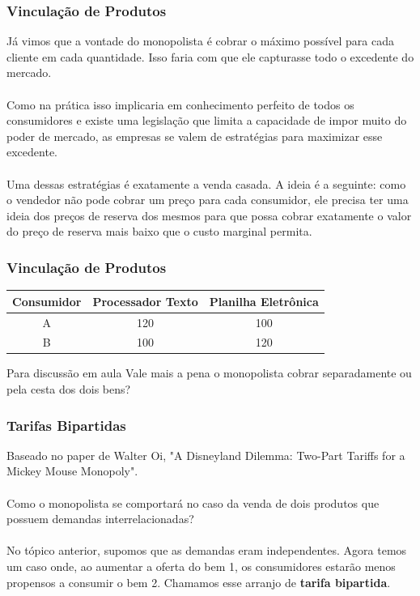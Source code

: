 \documentclass{beamer}[10]
\begin{document}

\begin{frame}
	\frametitle{Vinculação de Produtos}

	Já vimos que a vontade do monopolista é cobrar o máximo possível para cada cliente em cada quantidade. Isso faria com que ele capturasse todo o excedente do mercado. 
	\\~\\
	Como na prática isso implicaria em conhecimento perfeito de todos os consumidores e existe uma legislação que limita a capacidade de impor muito do poder de mercado, as empresas se valem de estratégias para maximizar esse excedente.
	\\~\\
	Uma dessas estratégias é exatamente a venda casada. A ideia é a seguinte: como o vendedor não pode cobrar um preço para cada consumidor, ele precisa ter uma ideia dos preços de reserva dos mesmos para que possa cobrar exatamente o valor do preço de reserva mais baixo que o custo marginal permita.

\end{frame}

\begin{frame}
	\frametitle{Vinculação de Produtos}

	\begin{center}
		\begin{tabular}{ |c|c|c| } 
		 \hline
		 Consumidor & Processador Texto & Planilha Eletrônica \\ 
		 \hline
		 A & 120 & 100 \\ 
		 B & 100 & 120 \\ 
		 \hline
		\end{tabular}
	\end{center}

	\begin{block}{Para discussão em aula}
		Vale mais a pena o monopolista cobrar separadamente ou pela cesta dos dois bens?
	\end{block}

\end{frame}


\begin{frame}
	\frametitle{Tarifas Bipartidas}

	Baseado no paper de Walter Oi, "A Disneyland Dilemma: Two-Part Tariffs for a Mickey Mouse Monopoly".
	\\~\\
	Como o monopolista se comportará no caso da venda de dois produtos que possuem demandas interrelacionadas?
	\\~\\
	No tópico anterior, supomos que as demandas eram independentes. Agora temos um caso onde, ao aumentar a oferta do bem 1, os consumidores estarão menos propensos a consumir o bem 2. Chamamos esse arranjo de \textbf{tarifa bipartida}.

\end{frame}
\end{document}
